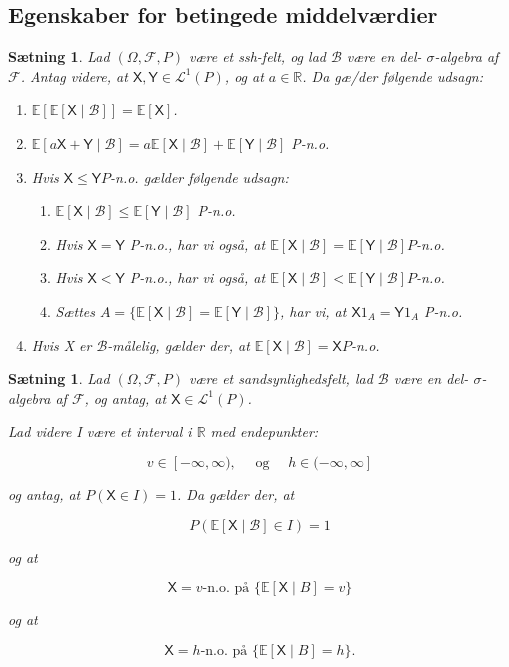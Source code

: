 \documentclass{article}
\newcommand{\1}{\mathbbm{1}}
\newcommand{\X}{\mathsf{X}}
\newcommand{\Y}{\mathsf{Y}}
\theoremstyle{boxed}
\newtheorem{proposition}[theorem]{Sætning}
\begin{document}
\subsection{Egenskaber for betingede middelværdier}
\begin{theorem-box}
    \begin{proposition}
        Lad $(\Omega, \mathcal{F}, P)$ være et ssh-felt, og lad $\mathcal{B}$ være en del- $\sigma$-algebra af $\mathcal{F}$. Antag videre, at $\X, \Y \in \mathcal{L}^1(P)$, og at $a \in \mathbb{R}$. Da gæ/der følgende udsagn:
\begin{enumerate}
    \item[\textnormal{(i)}]$\mathbb{E}[\mathbb{E}[\X \mid \mathcal{B}]]=\mathbb{E}[\X]$.
    \item[\textnormal{(ii)}] $\mathbb{E}[a \X+\Y \mid \mathcal{B}]=a \mathbb{E}[\X \mid \mathcal{B}]+\mathbb{E}[\Y \mid \mathcal{B}]$ P-n.o.
    \item[\textnormal{(iii)}] Hvis $\X \leq \Y P$-n.o. gælder følgende udsagn:
    \begin{enumerate}
        \item $\mathbb{E}[\X \mid \mathcal{B}] \leq \mathbb{E}[\Y \mid \mathcal{B}]$ P-n.o.
        \item Hvis $\X=\Y$ P-n.o., har vi også, at $\mathbb{E}[\X \mid \mathcal{B}]=\mathbb{E}[\Y \mid \mathcal{B}] P$-n.o.
        \item Hvis $\X<\Y$ P-n.o., har vi også, at $\mathbb{E}[\X \mid \mathcal{B}]<\mathbb{E}[\Y \mid \mathcal{B}] P$-n.o.
        \item Sættes $A=\{\mathbb{E}[\X \mid \mathcal{B}]=\mathbb{E}[\Y \mid \mathcal{B}]\}$, har vi, at $\X 1_A=\Y 1_A$ P-n.o.
    \end{enumerate}
    \item[\textnormal{(iv)}] Hvis X er $\mathcal{B}$-målelig, gælder der, at $\mathbb{E}[\X \mid \mathcal{B}]=\X P$-n.o.
\end{enumerate}
    \end{proposition}
\end{theorem-box}
\begin{theorem-box}
    \begin{proposition}
        Lad $(\Omega, \mathcal{F}, P)$ være et sandsynlighedsfelt, lad $\mathcal{B}$ være en del- $\sigma$-algebra af $\mathcal{F}$, og antag, at $\X \in \mathcal{L}^1(P)$.

Lad videre I være et interval i $\mathbb{R}$ med endepunkter:

$$
v \in[-\infty, \infty), \quad \text { og } \quad h \in(-\infty, \infty]
$$

og antag, at $P(\X \in I)=1$. Da gælder der, at

$$
P(\mathbb{E}[\X \mid \mathcal{B}] \in I)=1
$$

og at

$$
\X=v \text {-n.o. på }\{\mathbb{E}[\X \mid B]=v\}
$$

og at

$$
\X=h \text {-n.o. på }\{\mathbb{E}[\X \mid B]=h\} .
$$
    \end{proposition}
\end{theorem-box}
\end{document}
